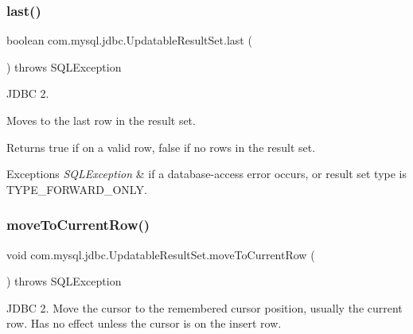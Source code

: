 \subsubsection{\texorpdfstring{last()}{last()}}
{\footnotesize\ttfamily boolean com.\+mysql.\+jdbc.\+Updatable\+Result\+Set.\+last (\begin{DoxyParamCaption}{ }\end{DoxyParamCaption}) throws S\+Q\+L\+Exception}

J\+D\+BC 2.

Moves to the last row in the result set. 

\begin{DoxyReturn}{Returns}
true if on a valid row, false if no rows in the result set.
\end{DoxyReturn}

\begin{DoxyExceptions}{Exceptions}
{\em S\+Q\+L\+Exception} & if a database-\/access error occurs, or result set type is T\+Y\+P\+E\+\_\+\+F\+O\+R\+W\+A\+R\+D\+\_\+\+O\+N\+LY. \\
\hline
\end{DoxyExceptions}
\mbox{\label{classcom_1_1mysql_1_1jdbc_1_1_updatable_result_set_aaae4d889848e114324a20bb5badc6c89}} 
\subsubsection{\texorpdfstring{move\+To\+Current\+Row()}{moveToCurrentRow()}}
{\footnotesize\ttfamily void com.\+mysql.\+jdbc.\+Updatable\+Result\+Set.\+move\+To\+Current\+Row (\begin{DoxyParamCaption}{ }\end{DoxyParamCaption}) throws S\+Q\+L\+Exception}

J\+D\+BC 2. Move the cursor to the remembered cursor position, usually the current row. Has no effect unless the cursor is on the insert row.


